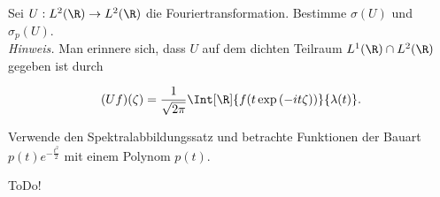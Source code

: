 \begin{exercise}[21/1]

Sei $U: L^2(\R) \to L^2(\R)$ die Fouriertransformation.
Bestimme $\sigma(U)$ und $\sigma_p(U)$. \\

\textit{Hinweis.}
Man erinnere sich, dass $U$ auf dem dichten Teilraum $L^1(\R) \cap L^2(\R)$ gegeben ist durch

\begin{align*}
  (U f)(\zeta)
  =
  \frac{1}{\sqrt{2 \pi}}
  \Int[\R]{f(t \exp{(-i t \zeta)})}{\lambda(t)}.
\end{align*}

Verwende den Spektralabbildungssatz und betrachte Funktionen der Bauart $p(t) e^{-\frac{t^2}{2}}$ mit einem Polynom $p(t)$.

\end{exercise}

\begin{solution}

ToDo!

\end{solution}
